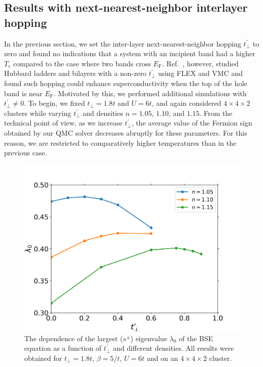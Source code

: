 \documentclass[prb,twocolumn,amsmath,amssymb,superscriptaddress,floatfix,nofootinbib]{revtex4-2}
\begin{document}
\subsection{Results with next-nearest-neighbor interlayer hopping}
In the previous section, we set the inter-layer next-nearest-neighbor hopping $t_\perp^{\prime}$ to zero and found 
no indications that a system with an incipient band had a higher $T_c$ compared to the case where two bands cross $E_\mathrm{F}$. 
Ref.~\cite{KurokiFlex2020}, however, studied Hubbard ladders and bilayers with a non-zero $t_\perp^{\prime}$ using FLEX and VMC and found such hopping could enhance superconductivity when the top of the hole band is near $E_\mathrm{F}$. Motivated by this, we performed additional simulations with  $t_\perp^{\prime} \ne 0$. To begin, we fixed $t_\perp =1.8t$ and $U=6t$, and again considered $4\times 4\times 2$ clusters while varying $t_\perp^{\prime}$ and densities $n=1.05$, $1.10$, and $1.15$. From the technical point of view, as we increase $t_\perp^{\prime}$, the average value of the Fermion sign obtained by our QMC solver decreases abruptly for these parameters. For this reason, we are restricted to comparatively higher temperatures than in the previous case. 

\begin{figure}[t]
\centering
\includegraphics[scale=0.4]{U6_tperp1pt8_varydensity.png}
\caption{The dependence of the largest ($s^\pm$) eigenvalue $\lambda_0$ of the BSE equation as a function of $t_{\perp}^{\prime}$ and  different densities. All results were obtained for $t_{\perp}=1.8t$, $\beta=5/t$, $U=6t$ and on an $4\times 4\times 2$ cluster.}
\label{fig:lambdatperpprime}
\end{figure}
\end{document}
